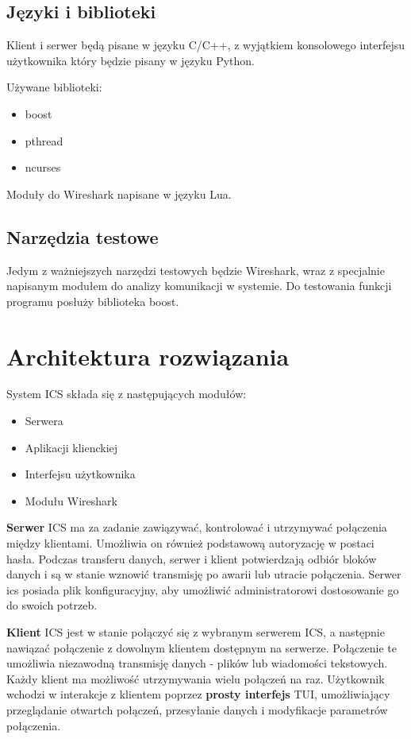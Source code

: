 \documentclass{article}
\begin{document}
\subsection{Języki i biblioteki}

Klient i serwer będą pisane w języku C/C++, z wyjątkiem konsolowego interfejsu użytkownika który będzie pisany w języku Python.

Używane biblioteki:
\begin{itemize}

\item boost
\item pthread
\item ncurses
  
\end{itemize}


Moduły do Wireshark napisane w języku Lua.

\subsection{Narzędzia testowe}

Jedym z ważniejszych narzędzi testowych będzie Wireshark, wraz z specjalnie napisanym modułem do analizy komunikacji w systemie.
 Do testowania funkcji programu posłuży biblioteka boost.

\section{Architektura rozwiązania\label{arch}}

System ICS składa się z następujących modułów:
\begin{itemize}
\item Serwera
\item Aplikacji klienckiej
\item Interfejsu użytkownika
\item Modułu Wireshark
\end{itemize}

\textbf{Serwer} ICS ma za zadanie zawiązywać, kontrolować i utrzymywać połączenia między klientami. Umożliwia on również podstawową autoryzację w postaci hasła. Podczas transferu danych, serwer i klient potwierdzają odbiór bloków danych i są w stanie wznowić transmisję po awarii lub utracie połączenia. Serwer ics posiada plik konfiguracyjny, aby umożliwić administratorowi dostosowanie go do swoich potrzeb.


\textbf{Klient} ICS jest w stanie połączyć się z wybranym serwerem ICS, a następnie nawiązać połączenie z dowolnym klientem dostępnym na serwerze. Połączenie te umożliwia niezawodną transmisję danych -  plików lub wiadomości tekstowych. Każdy klient ma możliwość utrzymywania wielu połączeń na raz. Użytkownik wchodzi w interakcje z klientem poprzez \textbf{prosty interfejs} TUI, umożliwiający przeglądanie otwartch połączeń, przesyłanie danych i modyfikacje parametrów połączenia.
\end{document}
